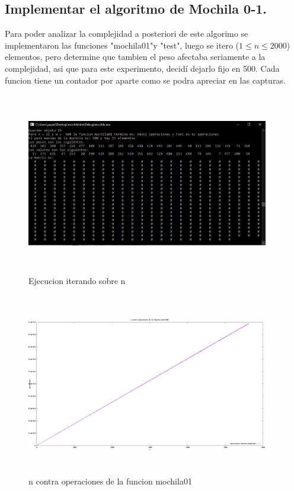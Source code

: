 \documentclass[spanish]{article}
\begin{document}
 	\subsection{Implementar el algoritmo de Mochila 0-1.} 
 		Para poder analizar la complejidad a posteriori de este algorimo se implementaron las funciones "mochila01"y "test", luego se itero ($1\leq n\leq 2000$) elementos, pero determine que tambien el peso afectaba seriamente a la complejidad, asi que para este experimento, decidí dejarlo fijo en 500. Cada funcion tiene un contador por aparte como se podra apreciar en las capturas.
 		\begin{figure}[H]
 			\centering
 			\includegraphics[width=400px,height=300px]{captura2}
 			\caption{Ejecucion iterando sobre n}
 		\end{figure}
	 	\begin{figure}[H]
	 		\centering
	 		\includegraphics[width=400px,height=300px]{grafica4}
	 		\caption{n contra operaciones de la funcion mochila01}
	 	\end{figure}
\end{document}
